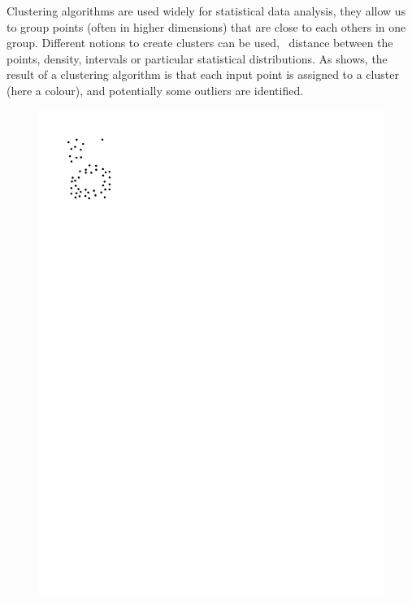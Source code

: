 Clustering algorithms are used widely for statistical data analysis, they allow us to group points (often in higher dimensions) that are close to each others in one group.
Different notions to create clusters can be used, \eg\ distance between the points, density, intervals or particular statistical distributions.
As  shows, the result of a clustering algorithm is that each input point is assigned to a cluster (here a colour), and potentially some outliers are identified.
\begin{marginfigure}
  \centering
  \begin{subfigure}[b]{0.6\linewidth}
    \centering
    \includegraphics[page=1,width=\textwidth]{figs/clustering.pdf}
    \caption{}
  \end{subfigure}%
  \qquad
  \begin{subfigure}[b]{0.6\linewidth}
    \centering

\end{subfigure}
\end{marginfigure}
